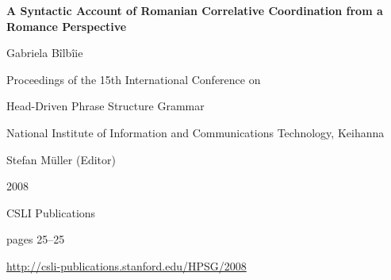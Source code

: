 \documentclass[a4paper,11pt]{article}
\begin{document}
\begin{center}
  {\huge\bf A Syntactic Account of Romanian Correlative Coordination from a Romance Perspective\par}

  \bigskip

  {\LARGE Gabriela Bîlbîie\par}

  \vspace*{3\bigskipamount}

  Proceedings of the 15th International Conference on\par Head-Driven Phrase Structure Grammar

  \bigskip

  National Institute of Information and Communications Technology, Keihanna

  \medskip

  Stefan Müller (Editor)

  \medskip

  2008

  \medskip

  CSLI Publications

  \medskip

  pages 25--25

  \medskip

  \url{http://csli-publications.stanford.edu/HPSG/2008}
\end{center}

\newpage

        
\end{document}
